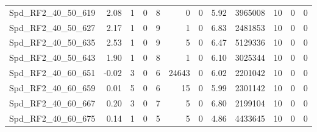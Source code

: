 \begin{longtable}[c]{@{}lrrrrrrrrrrr@{}}
Spd\_RF2\_40\_50\_619         & 2.08                   & 1                       & 0                       & 8                      & 0                       & 0                       & 5.92                    & 3965008                  & 10                       & 0                        & 0                        \\
Spd\_RF2\_40\_50\_627         & 2.17                   & 1                       & 0                       & 9                      & 1                       & 0                       & 6.83                    & 2481853                  & 10                       & 0                        & 0                        \\
Spd\_RF2\_40\_50\_635         & 2.53                   & 1                       & 0                       & 9                      & 5                       & 0                       & 6.47                    & 5129336                  & 10                       & 0                        & 0                        \\
Spd\_RF2\_40\_50\_643         & 1.90                   & 1                       & 0                       & 8                      & 1                       & 0                       & 6.10                    & 3025344                  & 10                       & 0                        & 0                        \\
Spd\_RF2\_40\_60\_651         & -0.02                  & 3                       & 0                       & 6                      & 24643                   & 0                       & 6.02                    & 2201042                  & 10                       & 0                        & 0                        \\
Spd\_RF2\_40\_60\_659         & 0.01                   & 5                       & 0                       & 6                      & 15                      & 0                       & 5.99                    & 2301142                  & 10                       & 0                        & 0                        \\
Spd\_RF2\_40\_60\_667         & 0.20                   & 3                       & 0                       & 7                      & 5                       & 0                       & 6.80                    & 2199104                  & 10                       & 0                        & 0                        \\
Spd\_RF2\_40\_60\_675         & 0.14                   & 1                       & 0                       & 5                      & 5                       & 0                       & 4.86                    & 4433645                  & 10                       & 0                        & 0                        \\

\end{longtable}
